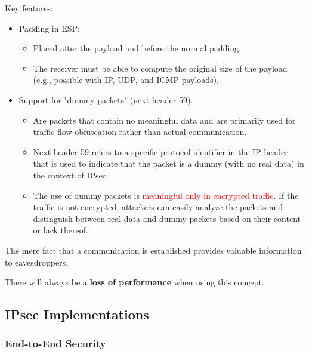 Key features:
\begin{itemize}
    \item Padding in ESP:
    \begin{itemize}
        \item Placed after the payload and before the normal padding.
        \item The receiver must be able to compute the original size of the payload (e.g., possible with IP, UDP, and ICMP payloads).
    \end{itemize}
    \item Support for "dummy packets" (next header 59).
        \begin{itemize}
            \item Are packets that contain no meaningful data and are primarily used for traffic flow obfuscation rather than actual communication.
            \item Next header 59 refers to a specific protocol identifier in the IP header that is used to indicate that the packet is a dummy (with no real data) in the context of IPsec.
            \item The use of dummy packets is \textcolor{red}{meaningful only in encrypted traffic}. If the traffic is not encrypted, attackers can easily analyze the packets and distinguish between real data and dummy packets based on their content or lack thereof.
        \end{itemize}
\end{itemize}

\begin{tcolorbox}[colback=blue!10!white, colframe=blue!50!white, title=Cool Information]
    The mere fact that a communication is established provides valuable information to eavesdroppers.
\end{tcolorbox}

\begin{tcolorbox}[colback=red!10!white, colframe=red!70!black, coltitle=white, title=Beware]
        There will always be a \textbf{loss of performance} when using this concept.
\end{tcolorbox}

\subsection{IPsec Implementations}

\subsubsection{End-to-End Security}

